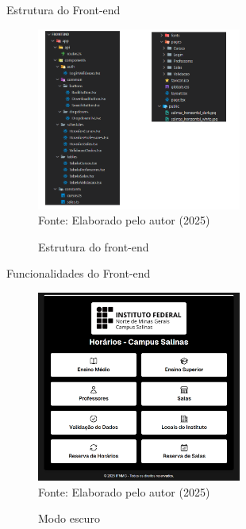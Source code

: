 \begin{frame}{Estrutura do Front-end}
    \begin{figure}
        \centering
        \vspace{-0.5cm}
        \caption{Estrutura do front-end}
        \vspace{-0.2cm}
        \includegraphics[width=0.6\textwidth]{figuras/front-14.png}
        \\ %
        \small Fonte: Elaborado pelo autor (2025)
    \end{figure}
\end{frame}

\begin{frame}{Funcionalidades do Front-end}
    \begin{figure}
        \centering
        \vspace{-0.5cm}
        \caption{Modo escuro}
        \vspace{-0.2cm}
        \includegraphics[width=0.6\textwidth]{figuras/front-15.png}
        \\ %
        \small Fonte: Elaborado pelo autor (2025)
    \end{figure}
\end{frame}

